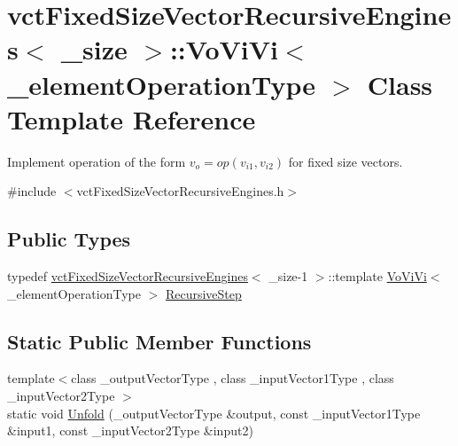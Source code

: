 \hypertarget{classvct_fixed_size_vector_recursive_engines_1_1_vo_vi_vi}{}\section{vct\+Fixed\+Size\+Vector\+Recursive\+Engines$<$ \+\_\+size $>$\+:\+:Vo\+Vi\+Vi$<$ \+\_\+element\+Operation\+Type $>$ Class Template Reference}
\label{classvct_fixed_size_vector_recursive_engines_1_1_vo_vi_vi}


Implement operation of the form $v_o = op(v_{i1}, v_{i2})$ for fixed size vectors.  




{\ttfamily \#include $<$vct\+Fixed\+Size\+Vector\+Recursive\+Engines.\+h$>$}

\subsection*{Public Types}
\begin{DoxyCompactItemize}
\item 
typedef \hyperlink{classvct_fixed_size_vector_recursive_engines}{vct\+Fixed\+Size\+Vector\+Recursive\+Engines}$<$ \+\_\+size-\/1 $>$\+::template \hyperlink{classvct_fixed_size_vector_recursive_engines_1_1_vo_vi_vi}{Vo\+Vi\+Vi}$<$ \+\_\+element\+Operation\+Type $>$ \hyperlink{classvct_fixed_size_vector_recursive_engines_1_1_vo_vi_vi_ab2721312ef2322e61092499ea592bef5}{Recursive\+Step}
\end{DoxyCompactItemize}
\subsection*{Static Public Member Functions}
\begin{DoxyCompactItemize}
\item 
{\footnotesize template$<$class \+\_\+output\+Vector\+Type , class \+\_\+input\+Vector1\+Type , class \+\_\+input\+Vector2\+Type $>$ }\\static void \hyperlink{classvct_fixed_size_vector_recursive_engines_1_1_vo_vi_vi_a0085c6d9a5fba75ef6922a41f5fc8e81}{Unfold} (\+\_\+output\+Vector\+Type \&output, const \+\_\+input\+Vector1\+Type \&input1, const \+\_\+input\+Vector2\+Type \&input2)
\end{DoxyCompactItemize}


